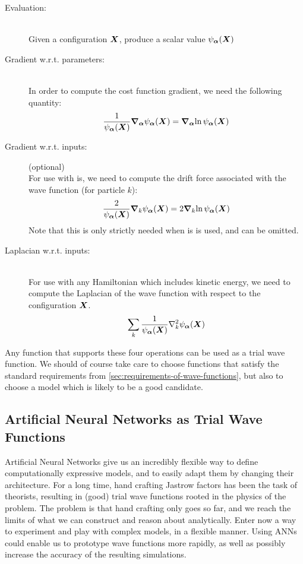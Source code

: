 \documentclass[Thesis.tex]{subfiles}
\begin{document}
\begin{description}
\item[Evaluation:]\hfill\\
  Given a configuration $\bm{X}$, produce a scalar value $\psi_{\bm{\alpha}}(\bm{X})$
\item[Gradient w.r.t. parameters:]\hfill\\
  In order to compute the cost function gradient, we need the following
  quantity:
  \begin{align}
    \label{eq:ml-vmc-operation-gradient}
    \frac{1}{\psi_{\bm{\alpha}}(\bm{X})}\grad_{\bm{\alpha}}{\psi_{\bm{\alpha}}(\bm{X})} = \grad_{\bm{\alpha}}{\ln\psi_{\bm{\alpha}}(\bm{X})}
  \end{align}
\item[Gradient w.r.t. inputs:](optional)\hfill\\
  For use with \gls{is}, we need to compute the drift force
  associated with the wave function (for particle $k$):
  \begin{align}
    \label{eq:ml-vmc-operation-drfit-force}
    \frac{2}{\psi_{\bm{\alpha}}(\bm{X})}\grad_k{\psi_{\bm{\alpha}}(\bm{X})} = 2 \grad_k{\ln\psi_{\bm{\alpha}}(\bm{X})}
  \end{align}
  Note that this is only strictly needed when \gls{is} is used, and
  can be omitted.
\item[Laplacian w.r.t. inputs:]\hfill\\
  For use with any Hamiltonian which includes kinetic energy, we need to compute
  the Laplacian of the wave function with respect to the configuration $\bm{X}$.
  \begin{align}
    \label{eq:ml-vmc-operation-laplacian}
    \sum_k\frac{1}{\psialpha(\vX)}\laplacian_k\psialpha(\vX)
  \end{align}
\end{description}

Any function that supports these four operations can be used as a trial wave
function. We should of course take care to choose functions that satisfy the
standard requirements from \cref{sec:requirements-of-wave-functions}, but also
to choose a model which is likely to be a good candidate.

\subsection{Artificial Neural Networks as Trial Wave Functions}

Artificial Neural Networks give us an incredibly flexible way to define
computationally expressive models, and to easily adapt them by changing their
architecture. For a long time, hand crafting Jastrow factors has been the task
of theorists, resulting in (good) trial wave functions rooted in the physics of
the problem. The problem is that hand crafting only goes so far, and we reach
the limits of what we can construct and reason about analytically. Enter now a
way to experiment and play with complex models, in a flexible manner. Using ANNs
could enable us to prototype wave functions more rapidly, as well as possibly
increase the accuracy of the resulting simulations.
\end{document}
